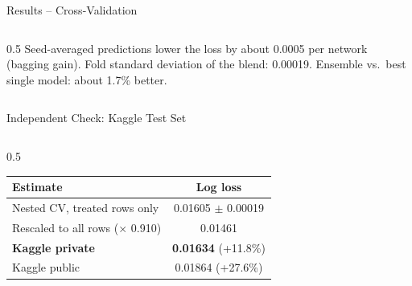 \documentclass[9pt,aspectratio=169]{beamer}
\begin{document}
\begin{frame}{Results -- Cross-Validation}
\begin{columns}[T]
\begin{column}{0.5\textwidth}
      \vspace{2mm}
      \scriptsize Seed-averaged predictions lower the loss by about 0.0005 per network (bagging gain). Fold standard deviation of the blend: 0.00019. Ensemble vs.\ best single model: about 1.7\% better.
    \end{column}
  \end{columns}
\end{frame}

\begin{frame}{Independent Check: Kaggle Test Set}
  \begin{columns}[T]
    \begin{column}{0.5\textwidth}
      \centering
      \small
      \begin{tabular}{@{}lc@{}}
        \toprule
        \textbf{Estimate} & \textbf{Log loss} \\
        \midrule
        Nested CV, treated rows only & 0.01605 $\pm$ 0.00019 \\
        Rescaled to all rows ($\times$ 0.910) & 0.01461 \\
        \textbf{Kaggle private} & \textbf{0.01634} (+11.8\%) \\
        Kaggle public & 0.01864 (+27.6\%) \\
        \bottomrule
      \end{tabular}


\end{column}
\end{columns}
\end{frame}
\end{document}

